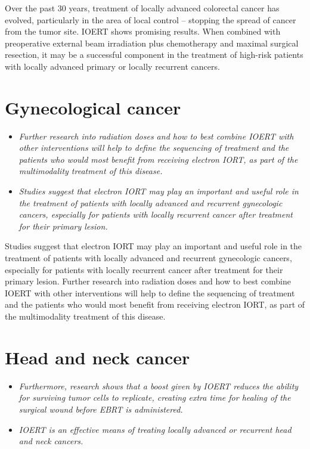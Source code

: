 Over the past 30 years, treatment of locally advanced colorectal cancer
has evolved, particularly in the area of local control -- stopping the
spread of cancer from the tumor site. IOERT shows promising results.
When combined with preoperative external beam irradiation plus
chemotherapy and maximal surgical resection, it may be a successful
component in the treatment of high-risk patients with locally advanced
primary or locally recurrent cancers.

\section{Gynecological cancer}\label{gynecological-cancer}

\begin{itemize}
\item
  \emph{Further research into radiation doses and how to best combine
  IOERT with other interventions will help to define the sequencing of
  treatment and the patients who would most benefit from receiving
  electron IORT, as part of the multimodality treatment of this
  disease.}
\item
  \emph{Studies suggest that electron IORT may play an important and
  useful role in the treatment of patients with locally advanced and
  recurrent gynecologic cancers, especially for patients with locally
  recurrent cancer after treatment for their primary lesion.}
\end{itemize}

Studies suggest that electron IORT may play an important and useful role
in the treatment of patients with locally advanced and recurrent
gynecologic cancers, especially for patients with locally recurrent
cancer after treatment for their primary lesion. Further research into
radiation doses and how to best combine IOERT with other interventions
will help to define the sequencing of treatment and the patients who
would most benefit from receiving electron IORT, as part of the
multimodality treatment of this disease.

\section{Head and neck cancer}\label{head-and-neck-cancer}

\begin{itemize}
\item
  \emph{Furthermore, research shows that a boost given by IOERT reduces
  the ability for surviving tumor cells to replicate, creating extra
  time for healing of the surgical wound before EBRT is administered.}
\item
  \emph{IOERT is an effective means of treating locally advanced or
  recurrent head and neck cancers.}
\end{itemize}

